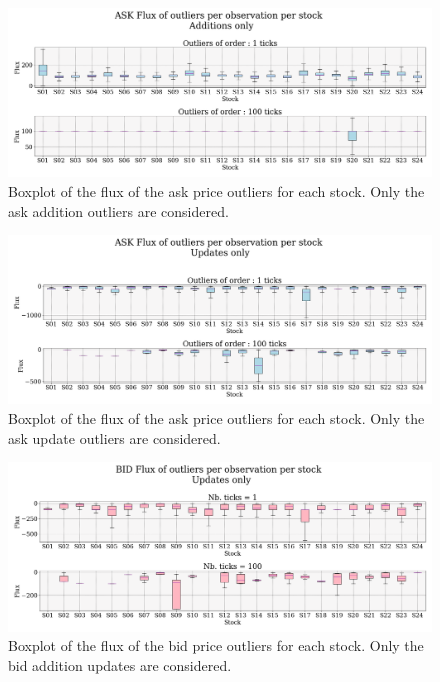 \documentclass[switch, 11pt]{article}
\begin{document}
\begin{figure}[H]
    \centering
    \includegraphics[width=\columnwidth]{figures/boxplot_flux_outliers_ASK.png}
    \caption{Boxplot of the flux of the ask price outliers for each stock. Only the ask addition outliers are considered.}
    \label{fig:flux_ask_add}
\end{figure}

\begin{figure}[H]
    \centering
    \includegraphics[width=\columnwidth]{figures/boxplot_flux_outliers_ASK_UPDATE.png}
    \caption{Boxplot of the flux of the ask price outliers for each stock. Only the ask update outliers are considered.}
    \label{fig:flux_ask_update}
\end{figure}

\begin{figure}[H]
    \centering
    \includegraphics[width=\columnwidth]{figures/boxplot_flux_outliers_BID_UPDATE.png}
    \caption{Boxplot of the flux of the bid price outliers for each stock. Only the bid addition updates are considered.}
    \label{fig:flux_bid_update}
\end{figure}
\end{document}
